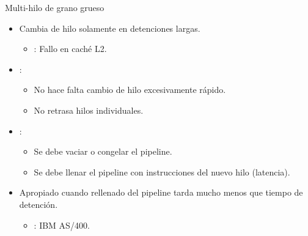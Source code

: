\begin{frame}[t]{Multi-hilo de grano grueso}
\begin{itemize}
  \item Cambia de hilo solamente en detenciones largas.
    \begin{itemize}
      \item {}: Fallo en caché L2.
    \end{itemize}

  \item {}:
    \begin{itemize}
      \item No hace falta cambio de hilo excesivamente rápido.
      \item No retrasa hilos individuales.
    \end{itemize}

  \item {}:
    \begin{itemize}
      \item Se debe vaciar o congelar el pipeline.
      \item Se debe llenar el pipeline con instrucciones del nuevo hilo (latencia).
    \end{itemize}

  \item Apropiado cuando rellenado del pipeline tarda mucho menos que tiempo de detención.
    \begin{itemize}
      \item {}: IBM AS/400.
    \end{itemize}
\end{itemize}
\end{frame}

